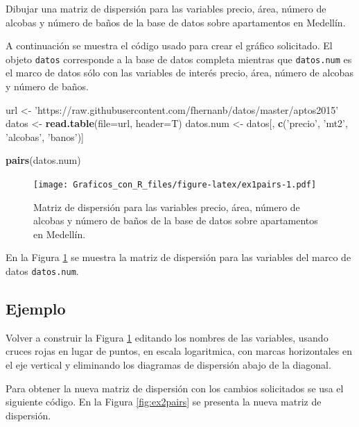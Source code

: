 \documentclass[10pt,]{krantz}
\makeatletter
\newenvironment{Shaded}{\begin{snugshade}}{\end{snugshade}}
\newcommand{\KeywordTok}[1]{\textcolor[rgb]{0.13,0.29,0.53}{\textbf{{#1}}}}
\newcommand{\DataTypeTok}[1]{\textcolor[rgb]{0.13,0.29,0.53}{{#1}}}
\newcommand{\StringTok}[1]{\textcolor[rgb]{0.31,0.60,0.02}{{#1}}}
\newcommand{\NormalTok}[1]{{#1}}
\newenvironment{kframe}{%
\medskip{}
\setlength{\fboxsep}{.8em}
 \def\at@end@of@kframe{}%
 \ifinner\ifhmode%
  \def\at@end@of@kframe{\end{minipage}}%
  \begin{minipage}{\columnwidth}%
 \fi\fi%
 \def\FrameCommand##1{\hskip\@totalleftmargin \hskip-\fboxsep
 \colorbox{shadecolor}{##1}\hskip-\fboxsep
     \hskip-\linewidth \hskip-\@totalleftmargin \hskip\columnwidth}%
 \MakeFramed {\advance\hsize-\width
   \@totalleftmargin\z@ \linewidth\hsize
   \@setminipage}}%
 {\par\unskip\endMakeFramed%
 \at@end@of@kframe}
\renewenvironment{Shaded}{\begin{kframe}}{\end{kframe}}
\makeatother
\begin{document}
Dibujar una matriz de dispersión para las variables precio, área, número
de alcobas y número de baños de la base de datos sobre apartamentos en
Medellín.

A continuación se muestra el código usado para crear el gráfico
solicitado. El objeto \texttt{datos} corresponde a la base de datos
completa mientras que \texttt{datos.num} es el marco de datos sólo con
las variables de interés precio, área, número de alcobas y número de
baños.

\begin{Shaded}
\begin{Highlighting}[]
\NormalTok{url <-}\StringTok{ 'https://raw.githubusercontent.com/fhernanb/datos/master/aptos2015'}
\NormalTok{datos <-}\StringTok{ }\KeywordTok{read.table}\NormalTok{(}\DataTypeTok{file=}\NormalTok{url, }\DataTypeTok{header=}\NormalTok{T)}
\NormalTok{datos.num <-}\StringTok{ }\NormalTok{datos[, }\KeywordTok{c}\NormalTok{(}\StringTok{'precio'}\NormalTok{, }\StringTok{'mt2'}\NormalTok{, }\StringTok{'alcobas'}\NormalTok{, }\StringTok{'banos'}\NormalTok{)]}

\KeywordTok{pairs}\NormalTok{(datos.num)}
\end{Highlighting}
\end{Shaded}

\begin{figure}[htbp]
\centering
\texttt{[image: Graficos\_con\_R\_files/figure-latex/ex1pairs-1.pdf]}
\caption{\label{fig:ex1pairs}Matriz de dispersión para las variables precio,
área, número de alcobas y número de baños de la base de datos sobre
apartamentos en Medellín.}
\end{figure}

En la Figura \ref{fig:ex1pairs} se muestra la matriz de dispersión para
las variables del marco de datos \texttt{datos.num}.

\subsection*{Ejemplo}\label{ejemplo-13}


Volver a construir la Figura \ref{fig:ex1pairs} editando los nombres de
las variables, usando cruces rojas en lugar de puntos, en escala
logaritmica, con marcas horizontales en el eje vertical y eliminando los
diagramas de dispersión abajo de la diagonal.

Para obtener la nueva matriz de dispersión con los cambios solicitados
se usa el siguiente código. En la Figura \ref{fig:ex2pairs} se presenta
la nueva matriz de dispersión.
\end{document}
